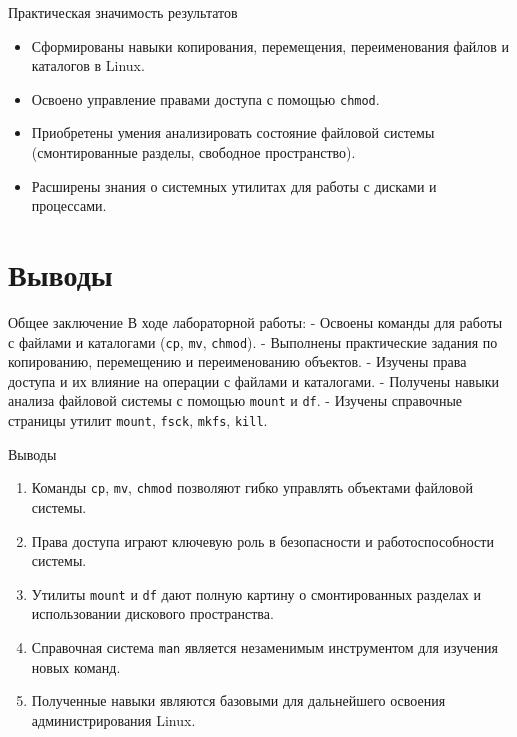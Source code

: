\documentclass[
  ignorenonframetext,
  aspectratio=169,
  russian,
  aspectratio=169]{beamer}
\providecommand{\tightlist}{%
  \setlength{\itemsep}{0pt}\setlength{\parskip}{0pt}}
\begin{document}
\begin{frame}[fragile]{Практическая значимость результатов}
\protect{}\label{ux43fux440ux430ux43aux442ux438ux447ux435ux441ux43aux430ux44f-ux437ux43dux430ux447ux438ux43cux43eux441ux442ux44c-ux440ux435ux437ux443ux43bux44cux442ux430ux442ux43eux432}
\begin{itemize}[<+->]
\tightlist
\item
  Сформированы навыки копирования, перемещения, переименования файлов и
  каталогов в Linux.
\item
  Освоено управление правами доступа с помощью \texttt{chmod}.
\item
  Приобретены умения анализировать состояние файловой системы
  (смонтированные разделы, свободное пространство).
\item
  Расширены знания о системных утилитах для работы с дисками и
  процессами.
\end{itemize}
\end{frame}

\section{Выводы}\label{ux432ux44bux432ux43eux434ux44b}

\begin{frame}[fragile]{Общее заключение}
\protect{}\label{ux43eux431ux449ux435ux435-ux437ux430ux43aux43bux44eux447ux435ux43dux438ux435}
В ходе лабораторной работы: - Освоены команды для работы с файлами и
каталогами (\texttt{cp}, \texttt{mv}, \texttt{chmod}). - Выполнены
практические задания по копированию, перемещению и переименованию
объектов. - Изучены права доступа и их влияние на операции с файлами и
каталогами. - Получены навыки анализа файловой системы с помощью
\texttt{mount} и \texttt{df}. - Изучены справочные страницы утилит
\texttt{mount}, \texttt{fsck}, \texttt{mkfs}, \texttt{kill}.
\end{frame}

\begin{frame}[fragile]{Выводы}
\protect{}\label{ux432ux44bux432ux43eux434ux44b-1}
\begin{enumerate}[<+->]
\tightlist
\item
  Команды \texttt{cp}, \texttt{mv}, \texttt{chmod} позволяют гибко
  управлять объектами файловой системы.
\item
  Права доступа играют ключевую роль в безопасности и работоспособности
  системы.
\item
  Утилиты \texttt{mount} и \texttt{df} дают полную картину о
  смонтированных разделах и использовании дискового пространства.
\item
  Справочная система \texttt{man} является незаменимым инструментом для
  изучения новых команд.
\item
  Полученные навыки являются базовыми для дальнейшего освоения
  администрирования Linux.
\end{enumerate}
\end{frame}
\end{document}
